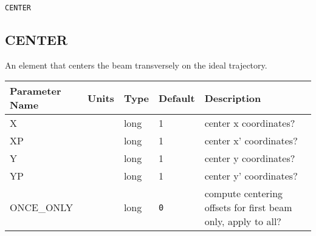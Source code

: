\begin{latexonly}
\newpage
\begin{center}{\Large\verb|CENTER|}\end{center}
\end{latexonly}\subsection{CENTER}
An element that centers the beam transversely on the ideal trajectory.
\\
\begin{tabular}{|l|l|l|l|p{\descwidth}|} \hline
Parameter Name & Units & Type & Default & Description \\ \hline 
X &  & long &   1               & center x coordinates?  \\ \hline 
XP &  & long &   1               & center x' coordinates?  \\ \hline 
Y &  & long &   1               & center y coordinates?  \\ \hline 
YP &  & long &   1               & center y' coordinates?  \\ \hline 
ONCE\_ONLY &  & long &  \verb|0| & compute centering offsets for first beam only, apply to all?  \\ \hline 
\end{tabular}

